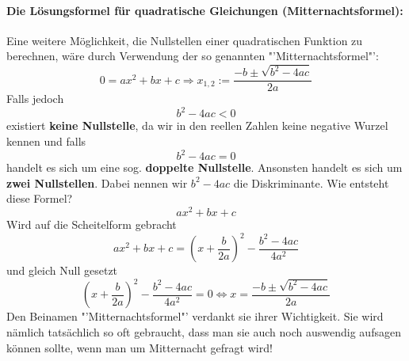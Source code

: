 \paragraph{Die Lösungsformel für quadratische Gleichungen (Mitternachtsformel):}
Eine weitere Möglichkeit, die Nullstellen einer quadratischen Funktion zu berechnen, wäre durch Verwendung der so genannten "'Mitternachtsformel"':
\begin{equation*}
0 = ax^2 + bx + c \Rightarrow x_{1,2} := \frac{-b \pm \sqrt{b^2 - 4ac}}{2a}
\end{equation*}
Falls jedoch 
\begin{equation*}
b^2 - 4ac < 0
\end{equation*}
existiert \textbf{keine Nullstelle}, da wir in den reellen Zahlen keine negative Wurzel kennen und falls
\begin{equation*}
b^2 - 4ac = 0
\end{equation*}
handelt es sich um eine sog. \textbf{doppelte Nullstelle}. Ansonsten handelt es sich um \textbf{zwei Nullstellen}. Dabei nennen wir $b^2 - 4ac$ die Diskriminante.
Wie entsteht diese Formel?
\begin{equation*}
 ax^2 + bx + c 
\end{equation*}
Wird auf die Scheitelform gebracht
\begin{equation*}
 ax^2 + bx + c  = \left(x + \frac{b}{2a} \right)^2 - \frac{b^2-4ac}{4a^2}
\end{equation*}
und gleich Null gesetzt
\begin{equation*}
\left(x + \frac{b}{2a}\right)^2 - \frac{b^2-4ac}{4a^2} = 0 \iff x = \frac{-b \pm \sqrt{b^2 - 4ac}}{2a}
\end{equation*}
Den Beinamen "'Mitternachtsformel"' verdankt sie ihrer Wichtigkeit. Sie wird nämlich tatsächlich so oft gebraucht, dass man sie auch noch auswendig aufsagen können sollte, wenn man um Mitternacht gefragt wird!%

